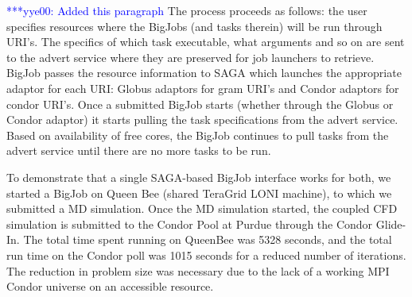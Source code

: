 \documentclass[conference,final]{IEEEtran}
\newcommand{\yyenote}[1]{ {\textcolor{blue} { ***yye00: #1 }}}
\begin{document}
\yyenote{Added this paragraph} The process proceeds as follows: the
user specifies resources where the BigJobs (and tasks therein) will be
run through URI's. The specifics of which task executable, what
arguments and so on are sent to the advert service where they are
preserved for job launchers to retrieve. BigJob passes the resource
information to SAGA which launches the appropriate adaptor for each
URI: Globus adaptors for gram URI's and Condor adaptors for condor
URI's. Once a submitted BigJob starts (whether through the Globus or
Condor adaptor) it starts pulling the task specifications from the
advert service. Based on availability of free cores, the BigJob
continues to pull tasks from the advert service until there are no
more tasks to be run.

To demonstrate that a single SAGA-based BigJob interface works for
both, we started a BigJob on Queen Bee (shared TeraGrid LONI machine),
to which we submitted a MD simulation. Once the MD simulation started,
the coupled CFD simulation is submitted to the Condor Pool at Purdue
through the Condor Glide-In. The total time spent running on QueenBee
was 5328 seconds, and the total run time on the Condor poll was 1015
seconds for a reduced number of iterations. The reduction in problem
size was necessary due to the lack of a working MPI Condor universe on
an accessible resource.
\end{document}
